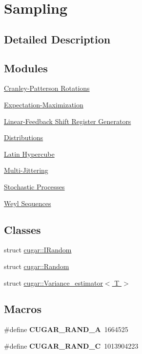 \hypertarget{group__sampling}{}\section{Sampling}
\label{group__sampling}


\subsection{Detailed Description}
\subsection*{Modules}
\begin{DoxyCompactItemize}
\item 
\hyperlink{group__cp__rotations}{Cranley-\/\+Patterson Rotations}
\item 
\hyperlink{group___expectation_maximization_module}{Expectation-\/\+Maximization}
\item 
\hyperlink{group___l_f_s_r_module}{Linear-\/\+Feedback Shift Register Generators}
\item 
\hyperlink{group__distributions}{Distributions}
\item 
\hyperlink{group___latiny_hypercube_module}{Latin Hypercube}
\item 
\hyperlink{group__multijitter}{Multi-\/\+Jittering}
\item 
\hyperlink{group__processes}{Stochastic Processes}
\item 
\hyperlink{group__weyl}{Weyl Sequences}
\end{DoxyCompactItemize}
\subsection*{Classes}
\begin{DoxyCompactItemize}
\item 
struct \hyperlink{structcugar_1_1_i_random}{cugar\+::\+I\+Random}
\item 
struct \hyperlink{structcugar_1_1_random}{cugar\+::\+Random}
\item 
struct \hyperlink{structcugar_1_1_variance__estimator}{cugar\+::\+Variance\+\_\+estimator$<$ T $>$}
\end{DoxyCompactItemize}
\subsection*{Macros}
\begin{DoxyCompactItemize}
\item 
\mbox{\label{group__sampling_ga7a3c744b1fe31105beec0fbcb743606d}} 
\#define {\bfseries C\+U\+G\+A\+R\+\_\+\+R\+A\+N\+D\+\_\+A}~1664525
\item 
\mbox{\label{group__sampling_ga44c94273d605b77ea3310d4aa8b78b94}} 
\#define {\bfseries C\+U\+G\+A\+R\+\_\+\+R\+A\+N\+D\+\_\+C}~1013904223
\end{DoxyCompactItemize}
